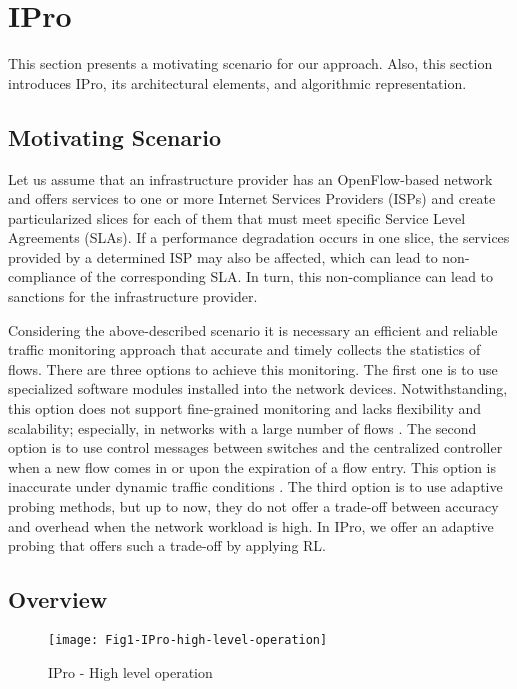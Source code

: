 \section{IPro}
\label{sec:intelligent_probing}
This section presents a motivating scenario for our approach. Also, this section introduces IPro, its architectural elements, and algorithmic representation.

\subsection{Motivating Scenario}
\label{subsec:motivating_scenario}
Let us assume that an infrastructure provider has an OpenFlow-based network and offers services to one or more Internet Services Providers (ISPs) and create particularized slices for each of them that must meet specific Service Level Agreements (SLAs). If a performance degradation occurs in one slice, the services provided by a determined ISP may also be affected, which can lead to non-compliance of the corresponding SLA. In turn, this non-compliance can lead to sanctions for the infrastructure provider.

Considering the above-described scenario it is necessary an efficient and reliable traffic monitoring approach that accurate and timely collects the statistics of flows. There are three options to achieve this monitoring. The first one is to use specialized software modules installed into the network devices. Notwithstanding, this option does not support fine-grained monitoring and lacks flexibility and scalability; especially, in networks with a large number of flows \cite{jose_2011:online_measurement}. The second option is to use control messages between switches and the centralized controller when a new flow comes in or upon the expiration of a flow entry. This option is inaccurate under dynamic traffic conditions \cite{megyesi_2017:challenges}. The third option is to use adaptive probing methods, but up to now, they do not offer a trade-off between accuracy and overhead when the network workload is high. In IPro, we offer an adaptive probing that offers such a trade-off by applying RL.

\subsection{Overview}
\label{subsec:Overview}
\begin{figure*}[h!]
    \centering
    \texttt{[image: Fig1-IPro-high-level-operation]}
    \caption{IPro - High level operation}
    \label{fig:high_level_ipro}
\end{figure*}

